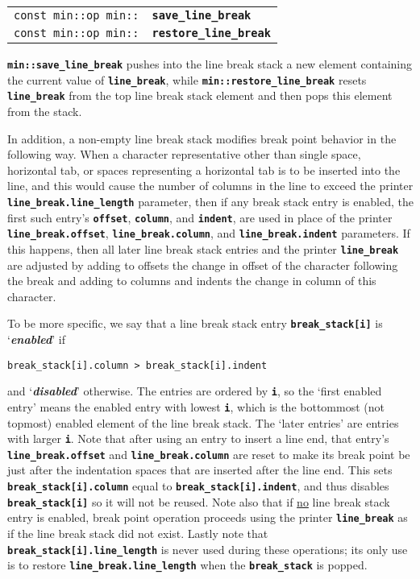 \documentclass[12pt]{article}
\makeatletter
\newcommand{\TT}[1]{{\tt \bfseries #1}}
\newcommand{\key}[1]{{\bf \em #1}\index{#1}}
\newcommand{\ttindex}[1]{\index{#1@{\tt #1}}}
\newcommand{\EOL}{\penalty \exhyphenpenalty}
\newenvironment{indpar}[1][0.3in]%
	{\begin{list}{}%
		     {\setlength{\itemsep}{0in}%
		      \setlength{\topsep}{0in}%
		      \setlength{\parsep}{1ex}%
		      \setlength{\labelwidth}{#1}%
		      \setlength{\leftmargin}{#1}%
		      \addtolength{\leftmargin}{\labelsep}}%
	 \item}%
	{\end{list}}
\newcommand{\LABEL}[1]{\label{#1}}
\newcommand{\MINKEY}[1]%
	   {\TT{#1}\ttindex{min::#1}\ttindex{#1}}
\makeatother
\begin{document}
\begin{indpar}[1em]\begin{tabular}{r@{}l}
\verb|const min::op min::|
    & \MINKEY{save\_line\_break}
\LABEL{MIN::SAVE_LINE_BREAK} \\
\verb|const min::op min::|
    & \MINKEY{restore\_line\_break}
\LABEL{MIN::RESTORE_LINE_BREAK} \\
\end{tabular}\end{indpar}

\TT{min::save\_line\_break}
pushes into the line break stack a new element containing
the current value of \TT{line\_\EOL break}, while
\TT{min::\EOL restore\_\EOL line\_\EOL break}
resets \TT{line\_\EOL break} from the top line break stack element and then
pops this element from the stack.

In addition, a non-empty line break stack modifies break point
behavior in the following way.
When a character representative other than single space, horizontal
tab, or spaces representing a horizontal tab
is to be inserted into the line, and this would cause the number
of columns in the line to exceed
the printer \TT{line\_\EOL break.line\_\EOL length} parameter,
then if any break stack entry is enabled, the first such entry's
\TT{offset}, \TT{column}, and \TT{indent},
are used in place of the printer
\TT{line\_\EOL break.offset},
\TT{line\_\EOL break.column}, and
\TT{line\_\EOL break.indent} parameters.
If this happens, then all later line break stack entries
and the printer \TT{line\_\EOL break}
are adjusted by adding to offsets
the change in offset of the character following the break and adding to
columns and indents the change in column of this character.

To be more specific, we say that a line break stack
entry \TT{break\_\EOL stack[i]} is `\key{enabled}' if
\begin{center}
\tt break\_stack[i].column > break\_stack[i].indent
\end{center}
and `\key{disabled}' otherwise.  The entries are ordered by \TT{i},
so the `first enabled entry' means the enabled entry with lowest \TT{i},
which is the bottommost (not topmost) enabled element of the line break stack.
The `later entries' are entries with larger \TT{i}.  Note that
after using an entry to insert a line end, that entry's
\TT{line\_\EOL break.offset}
and \TT{line\_\EOL break.column} are reset to make its break point
be just after the indentation spaces that are inserted after the line end.
This sets \TT{break\_\EOL stack[i].column}
equal to \TT{break\_\EOL stack[i].indent},
and thus disables \TT{break\_\EOL stack[i]} so it will not be reused.
Note also that if \underline{no} line break stack entry is enabled,
break point operation proceeds using the printer \TT{line\_\EOL break}
as if the line break stack did not exist.
Lastly note that \TT{break\_\EOL stack[i].line\_\EOL length} is never
used during these operations; its only use is to restore 
\TT{line\_\EOL break.line\_\EOL length} when the \TT{break\_\EOL stack}
is popped.
\end{document}
